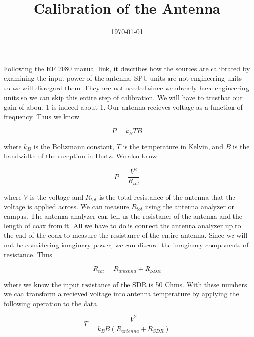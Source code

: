 \documentclass[letterpaper,12pt,notitlepage]{report} %
\title{Calibration of the Antenna}
\date{\today}
\begin{document}
\maketitle

Following the RF 2080 manual \href{https://radiojove.gsfc.nasa.gov/telescope/RF\%202080\%20Manual.doc}{link}, it describes how the sources are calibrated by examining the input power of the antenna. SPU units are not engineering units so we will disregard them. They are not needed since we already have engineering units so we can skip this entire step of calibration. We will have to trusthat our gain of about 1 is indeed about 1. Our antenna recieves voltage as a function of frequency. Thus we know 

	\[P=k_B T B\]

where $k_B$ is the Boltzmann constant, $T$ is the temperature in Kelvin, and $B$ is the bandwidth of the reception in Hertz. We also know 

	\[P=\frac{V^2}{R_{tot}}\]

where $V$ is the voltage and $R_{tot}$ is the total resistance of the antenna that the voltage is applied across. We can measure $R_{tot}$ using the antenna analyzer on campus. The antenna analyzer can tell us the resistance of the antenna and the length of coax from it. All we have to do is connect the antenna analyzer up to the end of the coax to measure the resistance of the entire antenna. Since we will not be considering imaginary power, we can discard the imaginary components of resistance. Thus 

	\[R_{tot}=R_{antenna} + R_{SDR} \]

where we know the input resistance of the SDR is 50 Ohms. With these numbers we can transform a recieved voltage into antenna temperature by applying the following operation to the data.

	\[T=\frac{V^2}{  k_B B (R_{antenna} + R_{SDR})} \]
\end{document}
